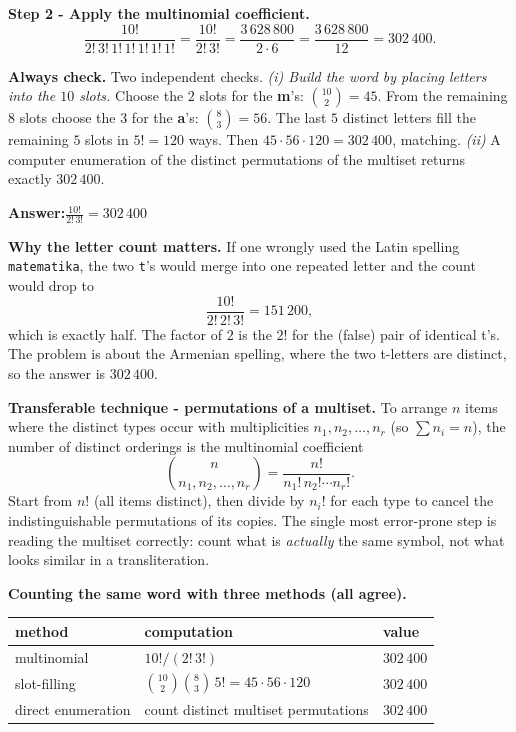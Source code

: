 \documentclass[11pt,a4paper]{article}
\newcommand{\answer}[1]{\begin{answerbox}\centering\textbf{Answer:}\quad #1\end{answerbox}}
\begin{document}
\textbf{Step 2 - Apply the multinomial coefficient.}
$$\frac{10!}{2!\,3!\,1!\,1!\,1!\,1!\,1!}=\frac{10!}{2!\,3!}
   =\frac{3\,628\,800}{2\cdot 6}=\frac{3\,628\,800}{12}=302\,400.$$

\textbf{Always check.} Two independent checks.
\emph{(i) Build the word by placing letters into the $10$ slots.} Choose the $2$ slots for the
\textbf{m}'s: $\binom{10}{2}=45$. From the remaining $8$ slots choose the $3$ for the \textbf{a}'s:
$\binom{8}{3}=56$. The last $5$ distinct letters fill the remaining $5$ slots in $5!=120$ ways. Then
$45\cdot 56\cdot 120 = 302\,400$, matching. \emph{(ii)} A computer enumeration of the distinct
permutations of the multiset returns exactly $302\,400$.

\answer{$\displaystyle \frac{10!}{2!\,3!}=302\,400$}

\medskip
\textbf{Why the letter count matters.} If one wrongly used the Latin spelling \texttt{matematika},
the two \texttt{t}'s would merge into one repeated letter and the count would drop to
$$\frac{10!}{2!\,2!\,3!}=151\,200,$$
which is exactly half. The factor of $2$ is the $2!$ for the (false) pair of identical t's. The
problem is about the Armenian spelling, where the two t-letters are distinct, so the answer is
$302\,400$.

\begin{methodbox}
\textbf{Transferable technique - permutations of a multiset.} To arrange $n$ items where the
distinct types occur with multiplicities $n_1,n_2,\dots,n_r$ (so $\sum n_i=n$), the number of
distinct orderings is the multinomial coefficient
$$\binom{n}{n_1,n_2,\dots,n_r}=\frac{n!}{n_1!\,n_2!\cdots n_r!}.$$
Start from $n!$ (all items distinct), then divide by $n_i!$ for each type to cancel the
indistinguishable permutations of its copies. The single most error-prone step is reading the
multiset correctly: count what is \emph{actually} the same symbol, not what looks similar in a
transliteration.
\end{methodbox}

\medskip
\textbf{Counting the same word with three methods (all agree).}

\begin{center}
\small
\begin{tabular}{@{}lll@{}}
\toprule
method & computation & value\\
\midrule
multinomial          & $10!/(2!\,3!)$                        & $302\,400$\\
slot-filling         & $\binom{10}{2}\binom{8}{3}\,5!=45\cdot56\cdot120$ & $302\,400$\\
direct enumeration   & count distinct multiset permutations  & $302\,400$\\
\bottomrule
\end{tabular}
\end{center}
\end{document}
